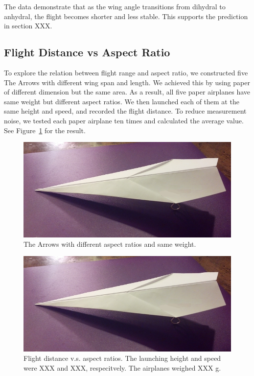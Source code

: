The data demonstrate that as the wing angle transitions from dihydral to anhydral, the flight becomes shorter and less stable. This supports the prediction in section XXX. 

\subsection{Flight Distance vs Aspect Ratio}

To explore the relation between flight range and aspect ratio, we constructed five The Arrows with different wing span and length. We achieved this by using paper of
different dimension but the same area. As a result, all five paper airplanes have same weight but different aspect ratios. We then launched each of them at the
same height and speed, and recorded the flight distance. To reduce measurement noise, we tested each paper airplane ten times and calculated the average value. See Figure~\ref{fig:aspectratio} 
for the result. 

\begin{figure}[hl]
	\centering
		\includegraphics[scale=0.5]{figures/aspectratio.png}
		\caption{The Arrows with different aspect ratios and same weight.}
	\label{fig:aspectratio}
\end{figure}

\begin{figure}[hl]
	\centering
		\includegraphics[scale=0.5]{figures/aspectratioresult.png}
		\caption{Flight distance v.s. aspect ratios. The launching height and speed were XXX and XXX, respecitvely. The airplanes weighed XXX g.}
	\label{fig:aspectratioresult}
\end{figure}



